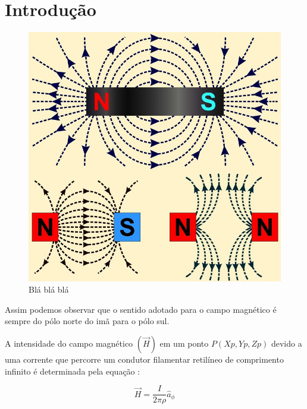 \documentclass[12pt,a4paper]{article}
\begin{document}


\newpage
\thispagestyle{empty}
\tableofcontents



\newpage

\setcounter{page}{1}
\section{Introdução}
\lipsum[1-2]

\begin{figure}[h!]
\centering \includegraphics[scale=0.3]{figuras/figura1.png}
\caption{Blá blá blá} \label{fig:fig1}
\end{figure}
\lipsum[1-1]

Assim podemos observar que o sentido adotado para o campo magnético é sempre do pólo
norte do imã para o pólo sul.

A intensidade do campo magnético $(\vec{H})$ em um ponto $P (Xp,Yp,Zp)$ devido a uma corrente que
percorre um condutor filamentar retilíneo de comprimento infinito é determinada pela equação :

\begin{equation}
\vec{H} = \frac{I}{2\pi \rho }\hat{a}_{\phi} 
\label{eq:eq1}
\end{equation}
\end{document}
